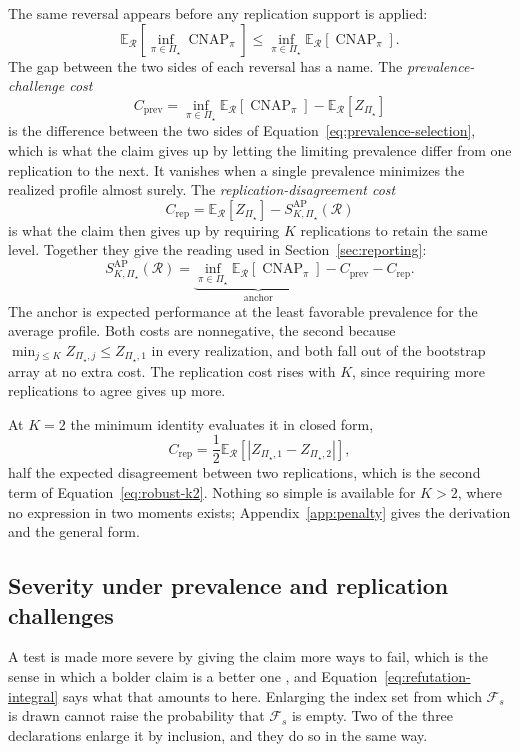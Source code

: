 \documentclass[11pt]{article}
\newcommand{\CNAP}{\operatorname{CNAP}}
\newcommand{\Regime}{\mathcal{R}}
\newcommand{\PSet}{\Pi_\star}
\newcommand{\E}{\mathbb{E}}
\newcommand{\SRob}{S_{K,\PSet}^{\mathrm{AP}}(\Regime)}
\newcommand{\RefSet}{\mathcal{F}}
\theoremstyle{remark}
\begin{document}
The same reversal appears before any replication support is applied:
\begin{equation}
\E_{\Regime}
\left[
\inf_{\pi\in\PSet}\CNAP_\pi
\right]
\leq
\inf_{\pi\in\PSet}
\E_{\Regime}
\left[
\CNAP_\pi
\right].
\label{eq:prevalence-selection}
\end{equation}
The gap between the two sides of each reversal has a name. The \emph{prevalence-challenge cost}
\[
C_{\mathrm{prev}}
=
\inf_{\pi\in\PSet}\E_{\Regime}[\CNAP_\pi]
-
\E_{\Regime}[Z_{\PSet}]
\]
is the difference between the two sides of Equation~\eqref{eq:prevalence-selection}, which is what the claim gives up by letting the limiting prevalence differ from one replication to the next. It vanishes when a single prevalence minimizes the realized profile almost surely. The \emph{replication-disagreement cost}
\[
C_{\mathrm{rep}}
=
\E_{\Regime}\left[Z_{\PSet}\right]
-
\SRob
\]
is what the claim then gives up by requiring $K$ replications to retain the same level. Together they give the reading used in Section~\ref{sec:reporting}:
\begin{equation}
\SRob
=
\underbrace{\inf_{\pi\in\PSet}\E_{\Regime}[\CNAP_\pi]}_{\text{anchor}}
-
C_{\mathrm{prev}}
-
C_{\mathrm{rep}}.
\label{eq:two-costs}
\end{equation}
The anchor is expected performance at the least favorable prevalence for the average profile. Both costs are nonnegative, the second because $\min_{j\leq K}Z_{\PSet,j}\leq Z_{\PSet,1}$ in every realization, and both fall out of the bootstrap array at no extra cost. The replication cost rises with $K$, since requiring more replications to agree gives up more.

At $K=2$ the minimum identity evaluates it in closed form,
\[
C_{\mathrm{rep}}
=
\frac12
\E_{\Regime}
\left[
|Z_{\PSet,1}-Z_{\PSet,2}|
\right],
\]
half the expected disagreement between two replications, which is the second term of Equation~\eqref{eq:robust-k2}. Nothing so simple is available for $K>2$, where no expression in two moments exists; Appendix~\ref{app:penalty} gives the derivation and the general form.

\subsection{Severity under prevalence and replication challenges}
\label{sec:severity}

A test is made more severe by giving the claim more ways to fail, which is the sense in which a bolder claim is a better one \cite{popper1963conjectures}, and Equation~\eqref{eq:refutation-integral} says what that amounts to here. Enlarging the index set from which $\RefSet_s$ is drawn cannot raise the probability that $\RefSet_s$ is empty. Two of the three declarations enlarge it by inclusion, and they do so in the same way.
\end{document}

